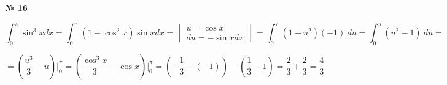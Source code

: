 \documentclass{article}
\begin{document}
\textbf{№ 16} 

$$ \int_{0}^{\pi} \sin^3{x}dx 
= \int_{0}^{\pi} (1-\cos^2{x})\sin{x}dx 
= \begin{vmatrix}   u  = \cos{x} \\ 
                    du = -\sin{x} dx \end{vmatrix}
= \int_{0}^{\pi} (1-u^2)(-1) \ du
= \int_{0}^{\pi} (u^2-1) \ du
= $$

$$ = \left( \frac{u^3}{3}-u \right) \bigg\vert_{0}^{\pi}
= \left( \frac{\cos^3{x}}{3}-\cos{x} \right) \bigg\vert_{0}^{\pi}
= \left( -\frac{1}{3} - (-1) \right) - \left( \frac{1}{3} - 1 \right)
= \frac{2}{3} + \frac{2}{3}
= \frac{4}{3}$$
\end{document}
